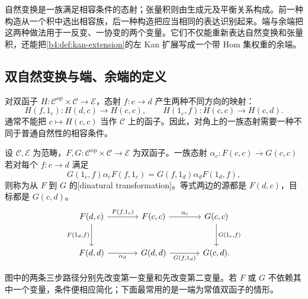 

自然变换是一族满足相容条件的态射；张量积则由生成元及平衡关系构成。前一种构造从一个积中选出相容族，后一种构造把应当相同的表达识别起来。端与余端把这两种做法用于一反变、一协变的两个变量。它们不仅能重新表达自然变换和张量积，还能把\cref{b4:def:kan-extension}的左 Kan 扩展写成一个带 Hom 集权重的余端。

\subsection{双自然变换与端、余端的定义}
\label{b4:subsec:0306:01}

对双函子 \(H:\mathcal C^{\mathrm{op}}\times\mathcal C\rightarrow\mathcal E\)，态射 \(f:c\rightarrow d\) 产生两种不同方向的映射：
\[
	H(f,1_c):H(d,c)\longrightarrow H(c,c),\qquad
	H(1_c,f):H(c,c)\longrightarrow H(c,d).
\]
通常不能把 \(c\mapsto H(c,c)\) 当作 \(\mathcal C\) 上的函子。因此，对角上的一族态射需要一种不同于普通自然性的相容条件。

\begin{definition}[双自然变换]\label{b4:def:dinatural-transformation}
	设 \(\mathcal C,\mathcal E\) 为范畴，\(F,G:\mathcal C^{\mathrm{op}}\times\mathcal C\rightarrow\mathcal E\) 为双函子。一族态射 \(\alpha_c:F(c,c)\rightarrow G(c,c)\) 若对每个 \(f:c\rightarrow d\) 满足
	\begin{equation}\label{b4:eq:dinaturality}
		G(1_c,f)\alpha_cF(f,1_c)
		=G(f,1_d)\alpha_dF(1_d,f),
	\end{equation}
	则称为从 \(F\) 到 \(G\) 的[dinatural transformation]。等式两边的源都是 \(F(d,c)\)，目标都是 \(G(c,d)\)。
	\[
		\begin{tikzcd}[column sep=large,row sep=large]
			F(d,c)\arrow[r,"{F(f,1_c)}"]\arrow[d,"{F(1_d,f)}"']&F(c,c)\arrow[r,"\alpha_c"]&G(c,c)\arrow[d,"{G(1_c,f)}"]\\
			F(d,d)\arrow[r,"\alpha_d"']&G(d,d)\arrow[r,"{G(f,1_d)}"']&G(c,d).
		\end{tikzcd}
	\]
\end{definition}

图中的两条三步路径分别先改变第一变量和先改变第二变量。若 \(F\) 或 \(G\) 不依赖其中一个变量，条件便相应简化；下面最常用的是一端为常值双函子的情形。

